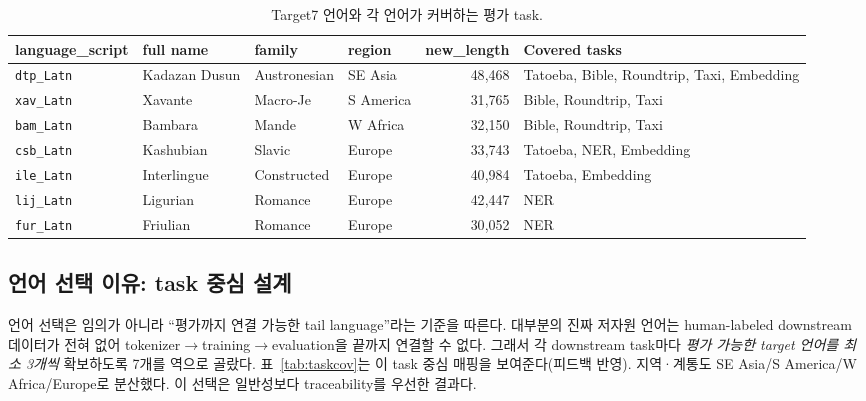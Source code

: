 \documentclass[11pt,a4paper]{article}
\begin{document}
\begin{table}[H]\centering\small
\caption{Target7 언어와 각 언어가 커버하는 평가 task.}
\begin{tabular}{@{}llllr>{\raggedright\arraybackslash}p{3.6cm}@{}}
\toprule
language\_script & full name & family & region & new\_length & Covered tasks \\
\midrule
\texttt{dtp\_Latn} & Kadazan Dusun & Austronesian & SE Asia & 48{,}468 & Tatoeba, Bible, Roundtrip, Taxi, Embedding \\
\texttt{xav\_Latn} & Xavante & Macro-Je & S America & 31{,}765 & Bible, Roundtrip, Taxi \\
\texttt{bam\_Latn} & Bambara & Mande & W Africa & 32{,}150 & Bible, Roundtrip, Taxi \\
\texttt{csb\_Latn} & Kashubian & Slavic & Europe & 33{,}743 & Tatoeba, NER, Embedding \\
\texttt{ile\_Latn} & Interlingue & Constructed & Europe & 40{,}984 & Tatoeba, Embedding \\
\texttt{lij\_Latn} & Ligurian & Romance & Europe & 42{,}447 & NER \\
\texttt{fur\_Latn} & Friulian & Romance & Europe & 30{,}052 & NER \\
\bottomrule
\end{tabular}
\end{table}

\subsection{언어 선택 이유: task 중심 설계}
언어 선택은 임의가 아니라 ``평가까지 연결 가능한 tail language''라는 기준을 따른다. 대부분의 진짜 저자원 언어는 human-labeled downstream 데이터가 전혀 없어 tokenizer$\to$training$\to$evaluation을 끝까지 연결할 수 없다. 그래서 각 downstream task마다 \emph{평가 가능한 target 언어를 최소 3개씩} 확보하도록 7개를 역으로 골랐다. 표~\ref{tab:taskcov}는 이 task 중심 매핑을 보여준다(피드백 반영). 지역·계통도 SE Asia/S America/W Africa/Europe로 분산했다. 이 선택은 일반성보다 traceability를 우선한 결과다.
\end{document}
